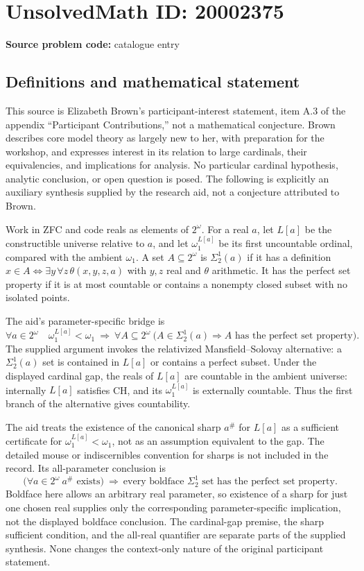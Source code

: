 \documentclass[11pt]{article}
\begin{document}
\section*{UnsolvedMath ID: 20002375}
\textbf{Source problem code:} catalogue entry
\subsection{Definitions and mathematical statement}
This source is Elizabeth Brown's participant-interest statement, item A.3 of the appendix ``Participant Contributions,'' not a mathematical conjecture. Brown describes core model theory as largely new to her, with preparation for the workshop, and expresses interest in its relation to large cardinals, their equivalencies, and implications for analysis. No particular cardinal hypothesis, analytic conclusion, or open question is posed. The following is explicitly an auxiliary synthesis supplied by the research aid, not a conjecture attributed to Brown.

Work in ZFC and code reals as elements of \(2^\omega\). For a real \(a\), let \(L[a]\) be the constructible universe relative to \(a\), and let \(\omega_1^{L[a]}\) be its first uncountable ordinal, compared with the ambient \(\omega_1\). A set \(A\subseteq2^\omega\) is \(\Sigma^1_2(a)\) if it has a definition \(x\in A\Longleftrightarrow\exists y\,\forall z\,\theta(x,y,z,a)\) with \(y,z\) real and \(\theta\) arithmetic. It has the perfect set property if it is at most countable or contains a nonempty closed subset with no isolated points.

The aid's parameter-specific bridge is
\[
 \forall a\in2^\omega\quad
 \omega_1^{L[a]}<\omega_1
 \ \Longrightarrow\
 \forall A\subseteq2^\omega\
 \bigl(A\in\Sigma^1_2(a)\Longrightarrow A\text{ has the perfect set property}\bigr).
\]
The supplied argument invokes the relativized Mansfield--Solovay alternative: a \(\Sigma^1_2(a)\) set is contained in \(L[a]\) or contains a perfect subset. Under the displayed cardinal gap, the reals of \(L[a]\) are countable in the ambient universe: internally \(L[a]\) satisfies CH, and its \(\omega_1^{L[a]}\) is externally countable. Thus the first branch of the alternative gives countability.

The aid treats the existence of the canonical sharp \(a^\#\) for \(L[a]\) as a sufficient certificate for \(\omega_1^{L[a]}<\omega_1\), not as an assumption equivalent to the gap. The detailed mouse or indiscernibles convention for sharps is not included in the record. Its all-parameter conclusion is
\[
 \bigl(\forall a\in2^\omega\ a^\#\text{ exists}\bigr)
 \ \Longrightarrow\
 \text{every boldface }\Sigma^1_2\text{ set has the perfect set property}.
\]
Boldface here allows an arbitrary real parameter, so existence of a sharp for just one chosen real supplies only the corresponding parameter-specific implication, not the displayed boldface conclusion. The cardinal-gap premise, the sharp sufficient condition, and the all-real quantifier are separate parts of the supplied synthesis. None changes the context-only nature of the original participant statement.
\end{document}
